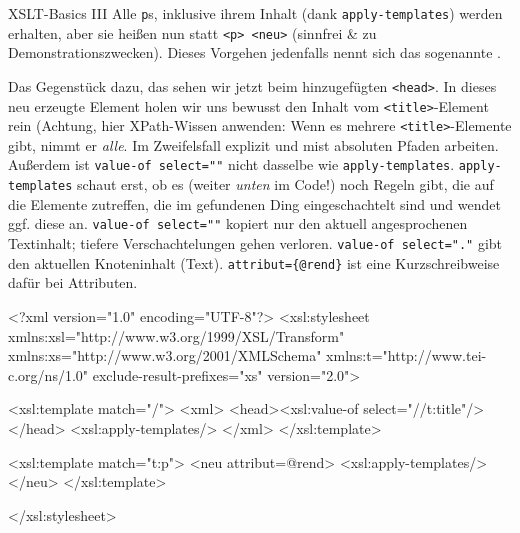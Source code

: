 \begin{frame}{XSLT-Basics III}
Alle \texttt{p}s, inklusive ihrem Inhalt (dank \texttt{apply-templates}) werden erhalten, aber sie heißen nun statt \texttt{<p> <neu>} (sinnfrei \& zu Demonstrationszwecken).
Dieses Vorgehen jedenfalls nennt sich das sogenannte .


Das Gegenstück dazu, das  sehen wir jetzt beim hinzugefügten \texttt{<head>}. In dieses neu erzeugte Element holen wir uns bewusst den Inhalt vom \texttt{<title>}-Element rein (Achtung, hier XPath-Wissen anwenden: Wenn es mehrere \texttt{<title>}-Elemente gibt, nimmt er \emph{alle}. Im Zweifelsfall explizit und mist absoluten Pfaden arbeiten. Außerdem ist \texttt{value-of select=""} nicht dasselbe wie \texttt{apply-templates}. \texttt{apply-templates} schaut erst, ob es (weiter \emph{unten} im Code!) noch Regeln gibt, die auf die Elemente zutreffen, die im gefundenen Ding eingeschachtelt sind und wendet ggf. diese an. \texttt{value-of select=""} kopiert nur den aktuell angesprochenen Textinhalt; tiefere Verschachtelungen gehen verloren. \texttt{value-of select="."} gibt den aktuellen Knoteninhalt (Text). \verb|attribut={@rend}| ist eine Kurzschreibweise dafür bei Attributen.
\begin{myxml}{}
<?xml version="1.0" encoding="UTF-8"?>
<xsl:stylesheet xmlns:xsl="http://www.w3.org/1999/XSL/Transform"
    xmlns:xs="http://www.w3.org/2001/XMLSchema"
    xmlns:t="http://www.tei-c.org/ns/1.0"
    exclude-result-prefixes="xs"
    version="2.0">
       
    <xsl:template match="/">
        <xml>
            <head><xsl:value-of select="//t:title"/></head>
            <xsl:apply-templates/> 
        </xml>
    </xsl:template>
    
    <xsl:template match="t:p">
        <neu attribut={@rend}>
            <xsl:apply-templates/>
        </neu>
    </xsl:template>
    
</xsl:stylesheet>
\end{myxml}

\end{frame}

